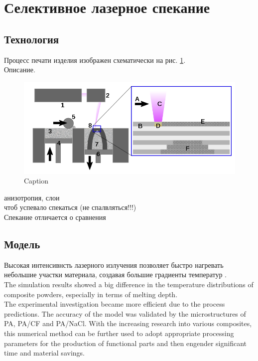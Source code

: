 

\section{Селективное лазерное спекание}
\subsection{Технология}
Процесс печати изделия изображен схематически на рис. \ref{fig:printer}.\\
Описание. 


\begin{figure}[h]
    \centering
    \includegraphics[width=\linewidth]{fig/sls.png}
    \caption{Caption}
    \label{fig:printer}
\end{figure}
анизотропия, слои\\
чтоб успевало спекаться (не спалвляться!!!)\\
Спекание отличается о сравнения

\subsection{Модель}
Высокая интенсивнсть лазерного излучения позволяет быстро нагревать небольшие участки материала, создавая большие градиенты температур \cite{sls-sim2016}.
\\

The simulation
results showed a big difference in the temperature distributions
of composite powders, especially in terms of melting depth.\\
The experimental investigation became more
efficient due to the process predictions. The accuracy of the model
was validated by the microstructures of PA, PA/CF and PA/NaCl.
With the increasing research into various composites, this numerical
method can be further used to adopt appropriate processing
parameters for the production of functional parts and then engender
significant time and material savings.
